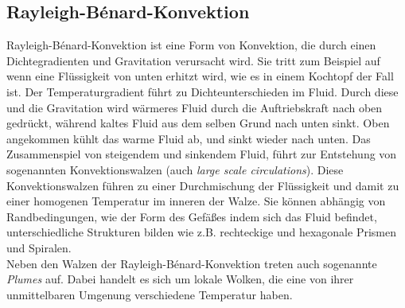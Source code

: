 \subsection{Rayleigh-B\'enard-Konvektion}
Rayleigh-B\'enard-Konvektion ist eine Form von Konvektion, die durch einen Dichtegradienten und Gravitation verursacht wird. 
Sie tritt zum Beispiel auf wenn eine Flüssigkeit von unten erhitzt wird, wie es in einem Kochtopf der Fall ist. 
Der Temperaturgradient führt zu Dichteunterschieden im Fluid. Durch diese und die Gravitation wird wärmeres Fluid durch die Auftriebskraft nach oben gedrückt, während kaltes Fluid aus dem selben Grund nach unten sinkt.
Oben angekommen kühlt das warme Fluid ab, und sinkt wieder nach unten. Das Zusammenspiel von steigendem und sinkendem Fluid, führt zur Entstehung von sogenannten Konvektionswalzen (auch \emph{large scale circulations}). Diese Konvektionswalzen führen zu einer Durchmischung der Flüssigkeit und damit zu einer homogenen Temperatur im inneren der Walze.
Sie können abhängig von Randbedingungen, wie der Form des Gefäßes indem sich das Fluid befindet, unterschiedliche Strukturen bilden wie z.B. rechteckige und hexagonale Prismen und Spiralen.
\\
Neben den Walzen der Rayleigh-B\'enard-Konvektion treten auch sogenannte \emph{Plumes} auf. Dabei handelt es sich um lokale Wolken, die eine von ihrer unmittelbaren Umgenung verschiedene Temperatur haben. 

